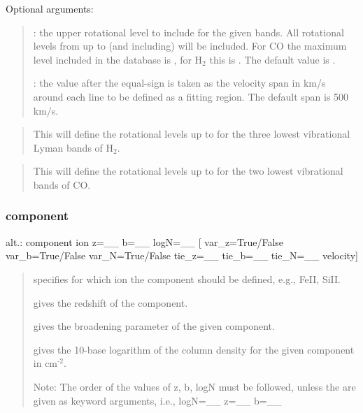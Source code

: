 \documentclass[letterpaper,10pt,english]{sphinxmanual}
\begin{document}
Optional arguments:
\begin{quote}

 : the upper rotational level to include for the given bands.
All rotational levels from  up to (and including)  will be included.
For CO the maximum  level included in the database is , for H$_{\text{2}}$ this is .
The default value is .

 : the value after the equal-sign is taken as the velocity
span in km/s around each line to be defined as a fitting region.
The default span is 500 km/s.
\end{quote}

\begin{sphinxShadowBox}

\begin{quote}

This will define the rotational levels up to  for the three lowest vibrational
Lyman bands of H$_{\text{2}}$.
\end{quote}

\begin{quote}

This will define the rotational levels up to  for the two lowest vibrational bands of CO.
\end{quote}
\end{sphinxShadowBox}


\subsubsection{component}
\label{\detokenize{documentation:component}}

alt.: component  ion  z=\_\_  b=\_\_  logN=\_\_  {[} var\_z=True/False  var\_b=True/False  var\_N=True/False
tie\_z=\_\_  tie\_b=\_\_  tie\_N=\_\_  velocity{]}
\begin{quote}

 specifies for which ion the component should be defined, e.g., FeII, SiII.

 gives the redshift of the component.

 gives the broadening parameter of the given component.

 gives the 10-base logarithm of the column density for the given component in cm$^{\text{-2}}$.

Note: The order of the values of z, b, logN must be followed, unless the are given
as keyword arguments, i.e., logN=\_\_  z=\_\_  b=\_\_
\end{quote}
\end{document}
